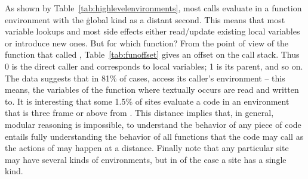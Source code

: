 \documentclass[review,screen,acmsmall,anonymous=true]{acmart}
\begin{document}
\noindent
As shown by Table~\ref{tab:highlevelenvironments}, most calls evaluate in a
function environment with the \c{global} kind as a distant second. This means
that most variable lookups and most side effects either read/update existing
local variables or introduce new ones. But for which function? From the point of
view of the function that called \eval, Table~\ref{tab:funoffset} gives an
offset on the call stack. Thus 0 is the direct caller and corresponds to local variables; 1 is its parent, and so on. The data suggests that in 81\% of cases, \eval access its caller's environment -- this means, the variables of the function where \eval textually
occurs are read and written to. It is interesting that some 1.5\% of sites
evaluate a code in an environment that is three frame or above from \eval. This
distance implies that, in general, modular reasoning is impossible, to
understand the behavior of any piece of code entails fully understanding the
behavior of all functions that the code may call as the actions of \eval may
happen at a distance. Finally note that any particular site may have several
kinds of environments, but in \packageNbOneCategoryEnvirSitePercent of the case a
site has a single kind.
\end{document}
